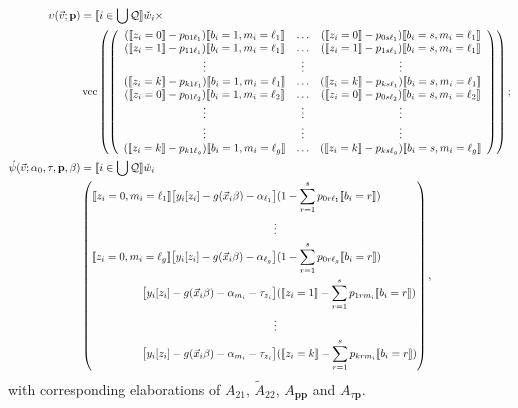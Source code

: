 \documentclass{article}
\DeclarePairedDelimiter{\indicator}{\llbracket}{\rrbracket}
\newcommand{\owt}[1][{[z_{i}]}]{\ensuremath{\check{w}_{i#1}}}
\newcommand{\absorbInterceptsEF}{\upsilon}
\begin{document}
\begin{align}
  \absorbInterceptsEF(\vec{v}; \mathbf{p}) &=
                                             \indicator{i \in \bigcup \mathcal{Q}} \owt[] \times \nonumber \\
  &\operatorname{vec}\left(%
    \left(
    \begin{array}{ccc}
      (\indicator{z_{i}=0}-p_{01\ell_{1}})\indicator{b_{i}=1, m_{i}=\ell_{1}}
      &\ldots
      &
        (\indicator{z_{i}=0}-p_{0s\ell_{1}})\indicator{b_{i}=s, m_{i}=\ell_{1}}
      \\
      (\indicator{z_{i}=1}-p_{11\ell_{1}})\indicator{b_{i}=1, m_{i}=\ell_{1}}
      &\ldots
      &
        (\indicator{z_{i}=1}-p_{1s\ell_{1}})\indicator{b_{i}=s, m_{i}=\ell_{1}}
      \\
      \vdots & \vdots & \vdots \\
      (\indicator{z_{i}=k}-p_{k1\ell_{1}})\indicator{b_{i}=1, m_{i}=\ell_{1}}
      &\ldots
      &
        (\indicator{z_{i}=k}-p_{ks\ell_{1}})\indicator{b_{i}=s, m_{i}=\ell_{1}}\\                                 (\indicator{z_{i}=0}-p_{01\ell_{2}})\indicator{b_{i}=1, m_{i}=\ell_{2}}
      &\ldots
      &
        (\indicator{z_{i}=0}-p_{0s\ell_{2}})\indicator{b_{i}=s, m_{i}=\ell_{2}}
      \\
      \vdots & \vdots & \vdots \\
      \vdots & \vdots & \vdots \\
      (\indicator{z_{i}=k}-p_{k1\ell_{g}})\indicator{b_{i}=1, m_{i}=\ell_{g}}
      &\ldots
      &
        (\indicator{z_{i}=k}-p_{ks\ell_{g}})\indicator{b_{i}=s, m_{i}=\ell_{g}}\\          
    \end{array}
  \right)%
  \right) ;\nonumber \\
  \acute{\psi}(\vec{v}; \alpha_{0}, \tau, \mathbf{p}, \beta) &=
\indicator{i \in \bigcup \mathcal{Q}}\owt[] \nonumber \\
&\left(
  \begin{aligned}                                               
    \indicator{z_{i}=0, m_{i}=\ell_{1}} \big[y_{i}[z_{i}]
    -
    g(\vec{x}_{i}\beta)-\alpha_{\ell_{1}}\big]
    &(
  1 -
   \sum_{r=1}^{s}p_{0r\ell_{1}}\indicator{b_{i}=r}) \\
   \vdots\\
    \indicator{z_{i}=0, m_{i}=\ell_{g}} \big[y_{i}[z_{i}]
    -
    g(\vec{x}_{i}\beta)-\alpha_{\ell_{g}}\big]
    &(
   1 -
   \sum_{r=1}^{s}p_{0r\ell_{g}}\indicator{b_{i}=r}) \\   
    \big[y_{i}[z_{i}]
    -
    g(\vec{x}_{i}\beta)-\alpha_{m_{i}}-\tau_{z_{i}}\big]
    &(
    \indicator{z_{i}=1} - \sum_{r=1}^{s}p_{1rm_{i}}\indicator{b_{i}=r})\\
    \vdots \\
    {}\big[y_{i}[z_{i}]
    - g(\vec{x}_{i}\beta) - \alpha_{m_{i}}-
    \tau_{z_{i}}\big]
    &(\indicator{z_{i}=k}
    - \sum_{r=1}^{s}p_{krm_{i}}\indicator{b_{i}=r})\\
  \end{aligned}
\right), 
\end{align}
with corresponding elaborations of $A_{21}$, $\tilde{A}_{22}$,  $A_{\mathbf{p}\mathbf{p}}$ and
$A_{\tau \mathbf{p}}$. 
\end{document}
